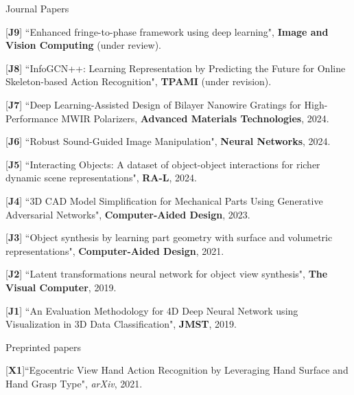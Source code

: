 \begin{cventries}
\vspace{-.5em}
\cvpub
{Journal Papers} %
{ %
\begin{cvitems}
    \item {[\textbf{J9}] ``Enhanced fringe-to-phase framework using deep learning", \textbf{Image and Vision Computing} (under review).}
    \item {[\textbf{J8}] ``InfoGCN++: Learning Representation by Predicting the Future for Online Skeleton-based Action Recognition", \textbf{TPAMI} (under revision). }
    \item {[\textbf{J7}] ``Deep Learning-Assisted Design of Bilayer Nanowire Gratings for High-Performance MWIR Polarizers, \textbf{Advanced Materials Technologies}, 2024. }
    \item {[\textbf{J6}] ``Robust Sound-Guided Image Manipulation", \textbf{Neural Networks}, 2024.}
    \item {[\textbf{J5}] ``Interacting Objects: A dataset of object-object interactions for richer dynamic scene representations", \textbf{RA-L}, 2024.}
    \item {[\textbf{J4}] ``3D CAD Model Simplification for Mechanical Parts Using Generative Adversarial Networks", \textbf{Computer-Aided Design}, 2023.}
    \item {[\textbf{J3}] ``Object synthesis by learning part geometry with surface and volumetric representations", \textbf{Computer-Aided Design}, 2021.}
    \item {[\textbf{J2}] ``Latent transformations neural network for object view synthesis", \textbf{The Visual Computer}, 2019.}
    \item {[\textbf{J1}] ``An Evaluation Methodology for 4D Deep Neural Network using Visualization in 3D Data Classification", \textbf{JMST}, 2019.}
\end{cvitems}
}

\vspace{-.5em}
\cvpub
{Preprinted papers} %
{
\begin{cvitems}
    \item {[\textbf{X1}]``Egocentric View Hand Action Recognition by Leveraging Hand Surface and Hand Grasp Type", \textit{arXiv}, 2021. }
\end{cvitems}
}


\end{cventries}

